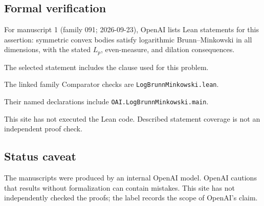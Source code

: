 \documentclass[11pt]{article}
\begin{document}
\subsection{Formal verification}
For manuscript 1 (family 091; 2026-09-23), OpenAI lists Lean statements for this assertion: symmetric convex bodies satisfy logarithmic Brunn--Minkowski in all dimensions, with the stated $L_p$, even-measure, and dilation consequences.

The selected statement includes the clause used for this problem.

The linked family Comparator checks are \texttt{LogBrunnMinkowski.lean}.

Their named declarations include \texttt{OAI.LogBrunnMinkowski.main}.

This site has not executed the Lean code. Described statement coverage is not an independent proof check.

\subsection{Status caveat}
The manuscripts were produced by an internal OpenAI model. OpenAI cautions that results without formalization can contain mistakes. This site has not independently checked the proofs; the label records the scope of OpenAI's claim.
\end{document}
